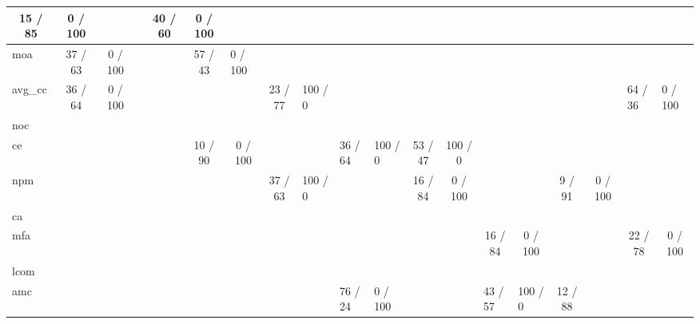 \begin{table}[t!]
\begin{tabular}{|l@{~}|l@{~}|l@{~}|l@{~}|l@{~}|l@{~}|l@{~}|l@{~}|l@{~}|l@{~}|l@{~}|l@{~}|l@{~}|l@{~}|l@{~}|l@{~}|l@{~}|l@{~}|l@{~}|}
  \multicolumn{1}{c|}{\cellcolor[HTML]{B7E1CD}15 / 85} &
  \multicolumn{1}{c|}{\cellcolor[HTML]{B7E1CD}0 / 100} &
   &
   &
  \multicolumn{1}{c|}{\cellcolor[HTML]{B7E1CD}40 / 60} &
  \multicolumn{1}{c|}{\cellcolor[HTML]{B7E1CD}0 / 100} &
   &
   &
   &
   &
   &
   &
   &
   \\ \hline
moa &
  \multicolumn{1}{c|}{\cellcolor[HTML]{B7E1CD}37 / 63} &
  \multicolumn{1}{c|}{\cellcolor[HTML]{B7E1CD}0 / 100} &
   &
   &
  \multicolumn{1}{c|}{57 / 43} &
  0 / 100 &
   &
   &
   &
   &
   &
   &
   &
   &
   &
   &
   &
   \\ \hline
avg\_cc &
  \multicolumn{1}{c|}{\cellcolor[HTML]{B7E1CD}36 / 64} &
  \multicolumn{1}{c|}{\cellcolor[HTML]{B7E1CD}0 / 100} &
   &
   &
   &
   &
  \multicolumn{1}{c|}{23 / 77} &
  100 / 0 &
   &
   &
   &
   &
   &
   &
   &
   &
  64 / 36 &
  0 / 100 \\ \hline
noc &
   &
   &
   &
   &
   &
   &
   &
   &
   &
   &
   &
   &
   &
   &
   &
   &
   &
   \\ \hline
ce &
   &
   &
   &
   &
  \multicolumn{1}{c|}{\cellcolor[HTML]{B7E1CD}10 / 90} &
  \multicolumn{1}{c|}{\cellcolor[HTML]{B7E1CD}0 / 100} &
   &
   &
  36 / 64 &
  100 / 0 &
  \multicolumn{1}{c|}{\cellcolor[HTML]{B7E1CD}53 / 47} &
  \multicolumn{1}{c|}{\cellcolor[HTML]{B7E1CD}100 / 0} &
   &
   &
   &
   &
   &
   \\ \hline
npm &
   &
   &
   &
   &
   &
   &
  \multicolumn{1}{c|}{37 / 63} &
  100 / 0 &
   &
   &
  \multicolumn{1}{c|}{\cellcolor[HTML]{B7E1CD}16 / 84} &
  \multicolumn{1}{c|}{\cellcolor[HTML]{B7E1CD}0 / 100} &
   &
   &
  \multicolumn{1}{c|}{\cellcolor[HTML]{B7E1CD}9 / 91} &
  \multicolumn{1}{c|}{\cellcolor[HTML]{B7E1CD}0 / 100} &
   &
   \\ \hline
ca &
   &
   &
   &
   &
   &
   &
   &
   &
   &
   &
   &
   &
   &
   &
   &
   &
   &
   \\ \hline
mfa &
   &
   &
   &
   &
   &
   &
   &
   &
   &
   &
   &
   &
  \multicolumn{1}{c|}{\cellcolor[HTML]{B7E1CD}16 / 84} &
  \multicolumn{1}{c|}{\cellcolor[HTML]{B7E1CD}0 / 100} &
   &
   &
  \multicolumn{1}{c|}{\cellcolor[HTML]{B7E1CD}22 / 78} &
  \multicolumn{1}{c|}{\cellcolor[HTML]{B7E1CD}0 / 100} \\ \hline
lcom &
   &
   &
   &
   &
   &
   &
   &
   &
   &
   &
   &
   &
   &
   &
   &
   &
   &
   \\ \hline
amc &
   &
   &
   &
   &
   &
   &
   &
   &
  76 / 24 &
  0 / 100 &
   &
   &
  43 / 57 &
  100 / 0 &
  \multicolumn{1}{c|}{\cellcolor[HTML]{B7E1CD}12 / 88} &

\end{tabular}
\end{table}
